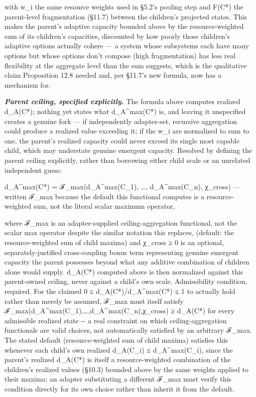\documentclass[
]{article}
\begin{document}
with w\_i the same resource weights used in §5.2's pooling step and
F(C*) the parent-level fragmentation (§11.7) between the children's
projected states. This makes the parent's adaptive capacity bounded
above by the resource-weighted sum of its children's capacities,
discounted by how poorly those children's adaptive options actually
cohere --- a system whose subsystems each have many options but whose
options don't compose (high fragmentation) has less real flexibility at
the aggregate level than the sum suggests, which is the qualitative
claim Proposition 12.8 needed and, per §11.7's new formula, now has a
mechanism for.

\emph{\textbf{Parent ceiling, specified explicitly.}} The formula above
computes realized d\_A(C*); nothing yet states what d\_A\^{}max(C*) is,
and leaving it unspecified creates a genuine fork --- if independently
adapter-set, recursive aggregation could produce a realized value
exceeding it; if the w\_i are normalized to sum to one, the parent's
realized capacity could never exceed its single most capable child,
which may understate genuine emergent capacity. Resolved by defining the
parent ceiling explicitly, rather than borrowing either child scale or
an unrelated independent guess:

d\_A\^{}max(C*) = ℱ\_max(d\_A\^{}max(C\_1), \ldots, d\_A\^{}max(C\_n),
χ\_cross) --- written ℱ\_max because the default this functional
computes is a resource-weighted sum, not the literal scalar maximum
operator,

where ℱ\_max is an adapter-supplied ceiling-aggregation functional, not
the scalar max operator despite the similar notation this replaces,
(default: the resource-weighted sum of child maxima) and χ\_cross ≥ 0 is
an optional, separately-justified cross-coupling bonus term representing
genuine emergent capacity the parent possesses beyond what any additive
combination of children alone would supply. d\_A(C*) computed above is
then normalized against this parent-owned ceiling, never against a
child's own scale. Admissibility condition, required. For the claimed 0
≤ d\_A(C*)/d\_A\^{}max(C*) ≤ 1 to actually hold rather than merely be
assumed, ℱ\_max must itself satisfy
ℱ\_max(d\_A\^{}max(C\_1),\ldots,d\_A\^{}max(C\_n),χ\_cross) ≥ d\_A(C*)
for every admissible realized state -\/- a real constraint on which
ceiling-aggregation functionals are valid choices, not automatically
satisfied by an arbitrary ℱ\_max. The stated default (resource-weighted
sum of child maxima) satisfies this whenever each child's own realized
d\_A(C\_i) ≤ d\_A\^{}max(C\_i), since the parent's realized d\_A(C*) is
itself a resource-weighted combination of the children's realized values
(§10.3) bounded above by the same weights applied to their maxima; an
adapter substituting a different ℱ\_max must verify this condition
directly for its own choice rather than inherit it from the default.
\end{document}
